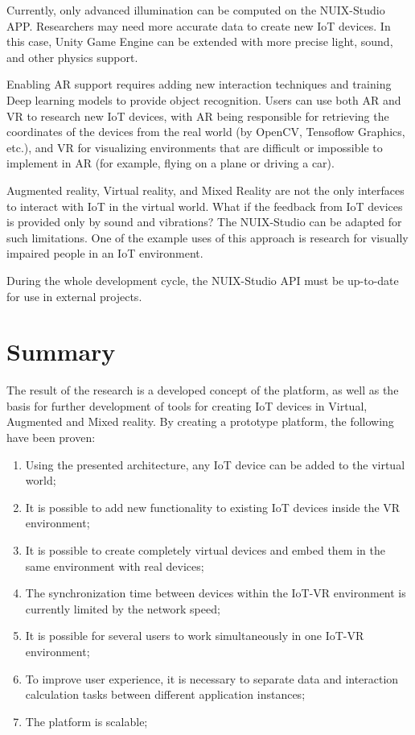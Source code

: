 Currently, only advanced illumination can be computed on the NUIX-Studio APP. Researchers may need more accurate data to create new IoT devices. In this case, Unity Game Engine can be extended with more precise light, sound, and other physics support.

Enabling AR support requires adding new interaction techniques and training Deep learning models to provide object recognition. Users can use both AR and VR to research new IoT devices, with AR being responsible for retrieving the coordinates of the devices from the real world (by OpenCV, Tensoflow Graphics, etc.), and VR for visualizing environments that are difficult or impossible to implement in AR (for example, flying on a plane or driving a car).

Augmented reality, Virtual reality, and Mixed Reality are not the only interfaces to interact with IoT in the virtual world. What if the feedback from IoT devices is provided only by sound and vibrations? The NUIX-Studio can be adapted for such limitations. One of the example uses of this approach is research for visually impaired people in an IoT environment.

During the whole development cycle, the NUIX-Studio API must be up-to-date for use in external projects. 

\section{Summary}

The result of the research is a developed concept of the platform, as well as the basis for further development of tools for creating IoT devices in Virtual, Augmented and Mixed reality. By creating a prototype platform, the following have been proven:
\begin{enumerate}
    \item Using the presented architecture, any IoT device can be added to the virtual world;
    \item It is possible to add new functionality to existing IoT devices inside the VR environment;
    \item It is possible to create completely virtual devices and embed them in the same environment with real devices;
    \item The synchronization time between devices within the IoT-VR environment is currently limited by the network speed;
    \item It is possible for several users to work simultaneously in one IoT-VR environment;
    \item To improve user experience, it is necessary to separate data and interaction calculation tasks between different application instances;
    \item The platform is scalable;
\end{enumerate}


